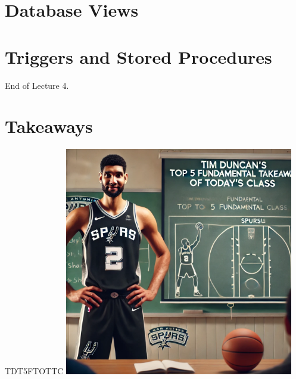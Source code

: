 \documentclass{beamer}
\begin{document}
\section{Database Views}


\section{Triggers and Stored Procedures}


\begin{frame}{}
    \centering
    \Huge End of Lecture 4.
\end{frame}

\section*{Takeaways}

\begin{frame}{TDT5FTOTTC}
    \centering
    \includegraphics[width=0.75\textwidth]{figures/tim.png}
\end{frame}
\end{document}
